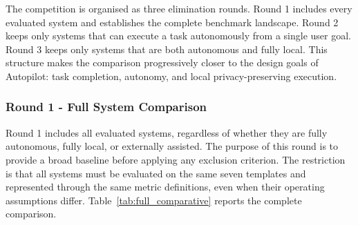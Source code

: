 The competition is organised as three elimination rounds. Round 1 includes every evaluated system and establishes the complete benchmark landscape. Round 2 keeps only systems that can execute a task autonomously from a single user goal. Round 3 keeps only systems that are both autonomous and fully local. This structure makes the comparison progressively closer to the design goals of Autopilot: task completion, autonomy, and local privacy-preserving execution.

\subsubsection{Round 1 - Full System Comparison}

Round 1 includes all evaluated systems, regardless of whether they are fully autonomous, fully local, or externally assisted. The purpose of this round is to provide a broad baseline before applying any exclusion criterion. The restriction is that all systems must be evaluated on the same seven templates and represented through the same metric definitions, even when their operating assumptions differ. Table~\ref{tab:full_comparative} reports the complete comparison.

